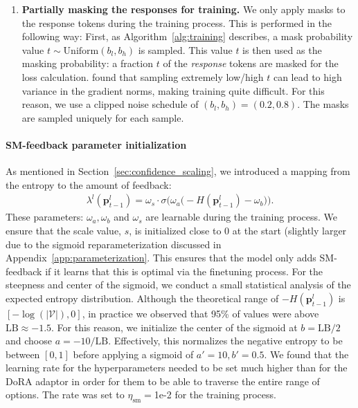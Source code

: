 \documentclass{article}
\begin{document}
\begin{enumerate}
    \item \textbf{Partially masking the responses for training.} We only apply masks to the response tokens during the training process. This is performed in the following way: 
    First, as Algorithm~\ref{alg:training} describes, a mask probability value $t \sim \text{Uniform}(b_l,b_h)$ is sampled. 
    This value $t$ is then used as the masking probability: a fraction $t$ of the \emph{response} tokens are masked for the loss calculation.
    \citet{arriola_block_2024} found that sampling extremely low/high $t$ can lead to high variance in the gradient norms, making training quite difficult. For this reason, we use a clipped noise schedule of $(b_l, b_h) = (0.2,0.8)$.
    The masks are sampled uniquely for each sample. 
\end{enumerate}

\paragraph{SM-feedback parameter initialization}
\label{app:initialization}
As mentioned in Section~\ref{sec:confidence_scaling}, we introduced a mapping from the entropy to the amount of feedback:
\begin{align}
    \lambda^l (\mathbf{p}^l_{t-1}) = \omega_s\cdot \sigma \Big(\omega_a\big(-H(\mathbf{p}^l_{t-1})-\omega_b\big)\Big). 
\end{align}
%
These parameters: $\omega_a, \omega_b$ and $\omega_s$ are learnable during the training process. 
%
We ensure that the scale value, $s$, is initialized close to 0 at the start (slightly larger due to the sigmoid reparameterization discussed in Appendix~\ref{app:parameterization}. 
%
This ensures that the model only adds SM-feedback if it learns that this is optimal via the finetuning process.
% 
For the steepness and center of the sigmoid, we conduct a small statistical analysis of the expected entropy distribution.
%
Although the theoretical range of $-H(\mathbf{p}^l_{t-1})$ is $[-\log(|\mathcal{V}|), 0]$, in practice we observed that 95\% of values were above $\text{LB} \approx -1.5$.  
%
For this reason, we initialize the center of the sigmoid at $b = \text{LB}/2$ and choose $a = -10/\text{LB}$. Effectively, this normalizes the negative entropy to be between $[0,1]$ before applying a sigmoid of $a'=10, b'=0.5$.
% 
We found that the learning rate for the hyperparameters needed to be set much higher than for the DoRA adaptor in order for them to be able to traverse the entire range of options. 
%
The rate was set to $\eta_{\text{sm}}=$1e-2 for the training process. 
\end{document}
